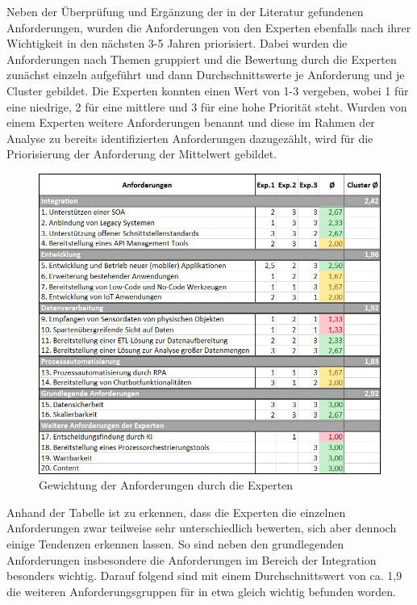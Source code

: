 Neben der Überprüfung und Ergänzung der in der Literatur gefundenen Anforderungen, wurden die Anforderungen von den Experten ebenfalls nach ihrer Wichtigkeit in den nächsten 3-5 Jahren priorisiert. Dabei wurden die Anforderungen nach Themen gruppiert und die Bewertung durch die Experten zunächst einzeln aufgeführt und dann Durchschnittswerte je Anforderung und je Cluster gebildet. Die Experten konnten einen Wert von 1-3 vergeben, wobei 1 für eine niedrige, 2 für eine mittlere und 3 für eine hohe Priorität steht. Wurden von einem Experten weitere Anforderungen benannt und diese im Rahmen der Analyse zu bereits identifizierten Anforderungen dazugezählt, wird für die Priorisierung der Anforderung der Mittelwert gebildet.

\begin{figure}[h]
    \centering
    \includegraphics[width=1\textwidth]{img/Gewichtung_Anforderung.jpg}
    \caption[Gewichtung der Anforderungen durch die Experten]{Gewichtung der Anforderungen durch die Experten\autocite{Gewichtung}}
    \label{fig:Gewichtung}
\end{figure}

Anhand der Tabelle ist zu erkennen, dass die Experten die einzelnen Anforderungen zwar teilweise sehr unterschiedlich bewerten, sich aber dennoch einige Tendenzen erkennen lassen. So sind neben den grundlegenden Anforderungen insbesondere die Anforderungen im Bereich der Integration besonders wichtig. Darauf folgend sind mit einem Durchschnittswert von ca. 1,9 die weiteren Anforderungsgruppen für in etwa gleich wichtig befunden worden. 

